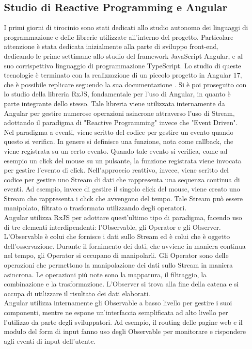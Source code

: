 \subsection{Studio di Reactive Programming e Angular}
I primi giorni di tirocinio sono stati dedicati allo studio autonomo dei linguaggi di programmazione e delle librerie utilizzate all'interno del progetto. Particolare attenzione è stata dedicata inizialmente alla parte di sviluppo front-end, dedicando le prime settimane allo studio del framework JavaScript Angular, e al suo corrispettivo linguaggio di programmazione TypeScript.
Lo studio di queste tecnologie è terminato con la realizzazione di un piccolo progetto in Angular 17, che è possibile replicare seguendo la sua documentazione \cite{DocumentazioneAngular}. Si è poi proseguito con lo studio della libreria RxJS, fondamentale per l'uso di Angular, in quanto è parte integrante dello stesso.
Tale libreria viene utilizzata internamente da Angular per gestire numerose operazioni asincrone attraverso l'uso di Stream, adottando il paradigma di "Reactive Programming" invece che "Event Driven".
\\Nel paradigma a eventi, viene scritto del codice per gestire un evento quando questo si verifica. In genere si definisce una funzione, nota come callback, che viene registrata su un certo evento. Quando tale evento si verifica, come ad esempio un click del mouse su un pulsante, la funzione registrata viene invocata per gestire l'evento di click.
Nell'approccio reattivo, invece, viene scritto del codice per gestire uno Stream di dati che rappresenta una sequenza continua di eventi. Ad esempio, invece di gestire il singolo click del mouse, viene creato uno Stream che rappresenta i click che avvengono del tempo. Tale Stream può essere manipolato, filtrato o trasformato utilizzando degli operatori.
\\Angular utilizza RxJS per adottare quest'ultimo tipo di paradigma, facendo uso di tre elementi interdipendenti: l'Observable, gli Operator e gli Observer.
\\L'Observable è colui che fornisce i dati sullo Stream ed è colui che è oggetto dell'osservazione. Durante il fornimento dei dati, che avviene in maniera continua nel tempo, gli Operator si occupano di manipolarli. Gli Operator sono delle operazioni che permettono la manipolazione dei dati sullo Stream in maniera asincrona. Le operazioni più note sono la mappatura, il filtraggio, la combinazione e la trasformazione. L'Observer si trova alla fine della catena e si occupa di utilizzare il risultato dei dati elaborati.
\\Angular utilizza internamente gli Observable a basso livello per gestire i suoi componenti, mentre ne espone un'interfaccia semplificata ad alto livello per l'utilizzo da parte degli sviluppatori. Ad esempio, il routing delle pagine web e il modulo del form di input fanno uso degli Observable per monitorare e rispondere agli eventi di input dell'utente.

